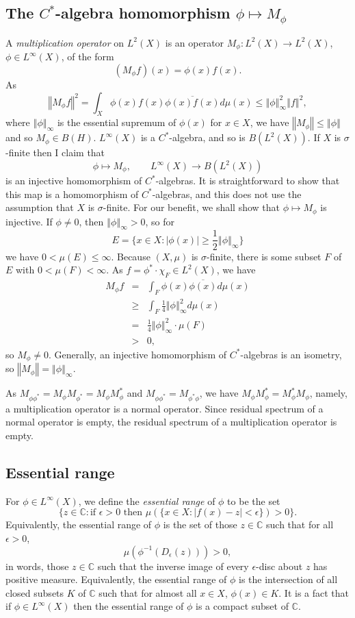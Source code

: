\documentclass{article}
\newcommand{\norm}[1]{\left\Vert #1 \right\Vert}
\begin{document}
\subsection{The $C^*$-algebra homomorphism $\phi \mapsto M_\phi$}
A {\em multiplication operator} on $L^2(X)$ is an operator $M_\phi:L^2(X) \to L^2(X)$, $\phi \in L^\infty(X)$, of the form
 \[
 (M_\phi f)(x)=\phi(x) f(x).
 \]
 As 
 \[
 \norm{M_\phi f}^2=\int_X \phi(x) f(x) \overline{\phi(x) f(x)} d\mu(x) \leq \norm{\phi}_\infty^2 \norm{f}^2,
 \]
 where $\norm{\phi}_\infty$ is the essential supremum of $\phi(x)$ for $x \in X$, we have $\norm{M_\phi} \leq \norm{\phi}$ and so $M_\phi \in B(H)$. $L^\infty(X)$ is a $C^*$-algebra, and so is
 $B(L^2(X))$. If $X$ is $\sigma$-finite then I claim that
 \[
 \phi \mapsto M_\phi, \qquad L^\infty(X) \to B(L^2(X))
 \]
 is an injective homomorphism of $C^*$-algebras. It is straightforward to show that this map is a homomorphism of $C^*$-algebras, and this 
 does not use the assumption that $X$ is $\sigma$-finite.
For our benefit, we shall show that
 $\phi \mapsto M_\phi$ is injective. 
 If $\phi \neq 0$, then
$\norm{\phi}_\infty>0$, so for  
\[
E=\{x \in X:|\phi(x)| \geq \frac{1}{2} \norm{\phi}_\infty\}
\]
 we have $0 < \mu(E) \leq \infty$. Because $(X,\mu)$ is $\sigma$-finite, there is
some subset $F$ of $E$ with $0<\mu(F)<\infty$. As $f=\phi^* \cdot \chi_F \in L^2(X)$, we have
\begin{eqnarray*}
M_\phi f &=&\int_F \phi(x) \overline{\phi(x)} d\mu(x)\\
&\geq&\int_F \frac{1}{4} \norm{\phi}_\infty^2  d\mu(x)\\
&=& \frac{1}{4} \norm{\phi}_\infty^2 \cdot \mu(F)\\
&>&0,
\end{eqnarray*}
so $M_\phi \neq 0$. 
 Generally, an injective homomorphism of $C^*$-algebras is an isometry, so $\norm{M_\phi}=\norm{\phi}_\infty$. 

As $M_{\phi \phi^*}=M_\phi M_{\phi^*}=M_\phi M_\phi^*$ and $M_{\phi \phi^*}=M_{\phi^* \phi}$, we have $M_\phi M_\phi^*=M_\phi^* M_\phi$, namely,
 a multiplication operator is a normal operator.
Since residual spectrum of a normal operator is empty, the 
residual spectrum of a multiplication operator is empty.

\subsection{Essential range}
For $\phi \in L^\infty(X)$, we define the {\em essential range} of $\phi$ to be the set 
\[
\Big\{z \in \mathbb{C}:\textrm{if $\epsilon>0$ then $\mu(\{x \in X:|f(x)-z|<\epsilon\})>0$}\Big\}.
\]
Equivalently, the essential range of $\phi$ is the set of those $z \in \mathbb{C}$ such that for all $\epsilon>0$,
\[
\mu(\phi^{-1}(D_\epsilon(z)))>0,
\]
in words, those $z \in \mathbb{C}$ such that the inverse image of every $\epsilon$-disc about $z$ has positive measure.
Equivalently, the essential range of $\phi$ is the intersection of all closed subsets $K$ of $\mathbb{C}$ such that for almost all $x \in X$, $\phi(x) \in K$.
It is a fact that if $\phi \in L^\infty(X)$ then the essential range of $\phi$ is a compact subset of $\mathbb{C}$.
\end{document}
